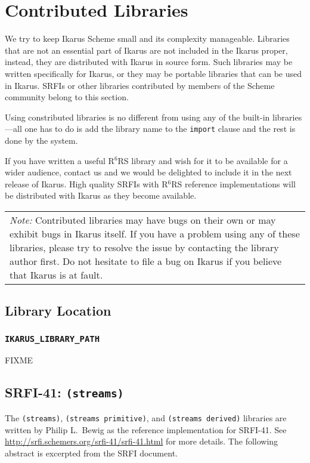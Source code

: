 \documentclass[onecolumn, 12pt, twoside, openright, dvipdfm]{book}
\newcommand{\rnrs}[1]{R$^{\mathrm{#1}}$RS}
\newcommand{\BoxedText}[2]{
  \vspace{.05in}
  \begin{center}
    \begin{tabular}{|p{4.6in}|} {\large \emph{#1}} #2 \end{tabular}
  \end{center}
  \vspace{.05in}
}
\begin{document}
\chapter{Contributed Libraries}

We try to keep Ikarus Scheme small and its complexity manageable.
Libraries that are not an essential part of Ikarus are not included
in the Ikarus proper, instead, they are distributed with Ikarus in
source form.  Such libraries may be written specifically
for Ikarus, or they may be portable libraries that can be used in
Ikarus.   SRFIs or other libraries contributed by members of the
Scheme community belong to this section.

Using constributed libraries is no different from using any of the
built-in libraries---all one has to do is add the library name to
the \texttt{import} clause and the rest is done by the system.

If you have written a useful \rnrs{6} library and wish for it to be
available for a wider audience, contact us and we would be delighted
to include it in the next release of Ikarus.  High quality SRFIs
with \rnrs{6} reference implementations will be distributed with
Ikarus as they become available.

\BoxedText{Note:}{Contributed libraries may have bugs on their own
or may exhibit bugs in Ikarus itself.  If you have a problem using
any of these libraries, please try to resolve the issue by
contacting the library author first.  Do not hesitate to file a bug
on Ikarus if you believe that Ikarus is at fault.}

\section{Library Location}



\subsection{\texttt{IKARUS\_LIBRARY\_PATH}}
FIXME



\newpage
\section{SRFI-41: \texttt{(streams)}}
The \texttt{(streams)}, \texttt{(streams~primitive)}, and
\texttt{(streams~derived)} libraries are written by Philip L.~Bewig 
as the reference implementation for SRFI-41.  
See \url{http://srfi.schemers.org/srfi-41/srfi-41.html} for more
details.  The following abstract is excerpted from the SRFI document.
\nocite{srfi41}
\end{document}
